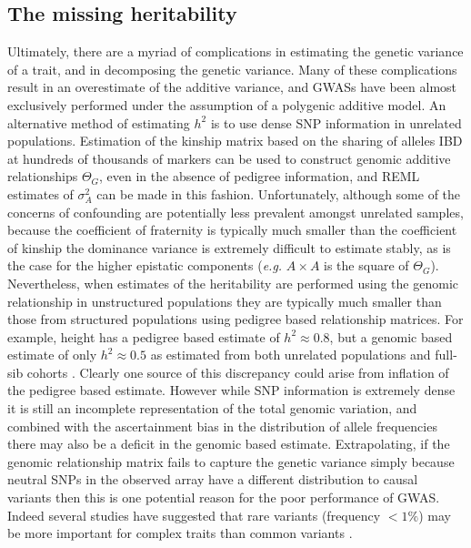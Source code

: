 \subsection{The missing heritability}

Ultimately, there are a myriad of complications in estimating the genetic variance of a trait, and in decomposing the genetic variance. Many of these complications result in an overestimate of the additive variance, and GWASs have been almost exclusively performed under the assumption of a polygenic additive model. An alternative method of estimating $h^2$ is to use dense SNP information in unrelated populations. Estimation of the kinship matrix based on the sharing of alleles IBD at hundreds of thousands of markers can be used to construct genomic additive relationships $\Theta_{G}$, even in the absence of pedigree information, and REML estimates of $\sigma^{2}_{A}$ can be made in this fashion. Unfortunately, although some of the concerns of confounding are potentially less prevalent amongst unrelated samples, because the coefficient of fraternity is typically much smaller than the coefficient of kinship the dominance variance is extremely difficult to estimate stably, as is the case for the higher epistatic components (\emph{e.g.} $A \times A$ is the square of $\Theta_{G}$). Nevertheless, when estimates of the heritability are performed using the genomic relationship in unstructured populations they are typically much smaller than those from structured populations using pedigree based relationship matrices. For example, height has a pedigree based estimate of $h^2 \approx 0.8$, but a genomic based estimate of only $h^2 \approx 0.5$ as estimated from both unrelated populations \citep{Yang2010} and full-sib cohorts \citep{Visscher2007}. Clearly one source of this discrepancy could arise from inflation of the pedigree based estimate. However while SNP information is extremely dense it is still an incomplete representation of the total genomic variation, and combined with the ascertainment bias in the distribution of allele frequencies there may also be a deficit in the genomic based estimate. Extrapolating, if the genomic relationship matrix fails to capture the genetic variance simply because neutral SNPs in the observed array have a different distribution to causal variants then this is one potential reason for the poor performance of GWAS. Indeed several studies have suggested that rare variants (frequency $< 1\%$) may be more important for complex traits than common variants \citep{Eyre-Walker2010}.

